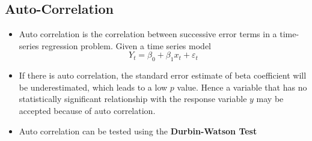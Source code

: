 \documentclass{article}
\theoremstyle{plain}
\theoremstyle{definition}
\begin{document}
\subsection{Auto-Correlation}
\begin{itemize}
    \item Auto correlation is the correlation between successive error terms in a time-series regression problem. Given a time series model
    \begin{equation*}
        Y_t = \beta_0 + \beta_1 x_t + \varepsilon_t
    \end{equation*}
    
    \item If there is auto correlation, the standard error estimate of beta coefficient will be underestimated, which leads to a low $p$ value. Hence a variable that has no statistically significant relationship with the response variable $y$ may be accepted because of auto correlation. 
    
    \item Auto correlation can be tested using the \textbf{Durbin-Watson Test}
\end{itemize}
\end{document}
